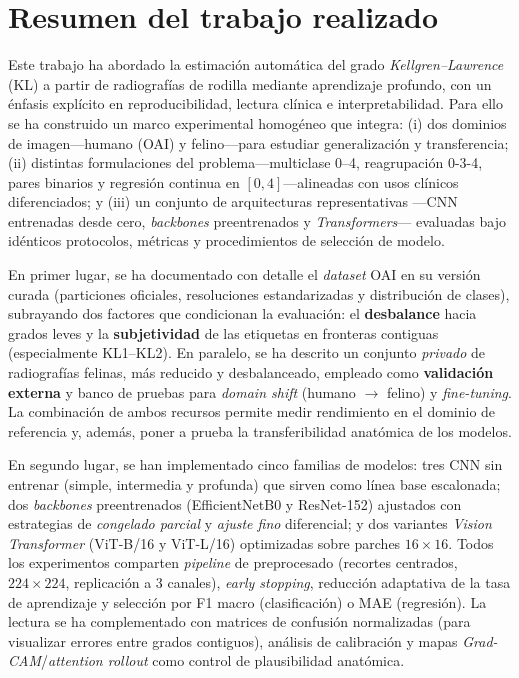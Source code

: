 \documentclass[11pt,spanish,listoffigures,listoftables]{tfgetsinf}
\begin{document}
\section{Resumen del trabajo realizado}
Este trabajo ha abordado la estimación automática del grado \emph{Kellgren--Lawrence} (KL) a partir de radiografías de rodilla mediante aprendizaje profundo, con un énfasis explícito en reproducibilidad, lectura clínica e interpretabilidad. Para ello se ha construido un marco experimental homogéneo que integra: (i) dos dominios de imagen—humano (OAI) y felino—para estudiar generalización y transferencia; (ii) distintas formulaciones del problema—multiclase 0--4, reagrupación 0-3-4, pares binarios y regresión continua en $[0,4]$—alineadas con usos clínicos diferenciados; y (iii) un conjunto de arquitecturas representativas —CNN entrenadas desde cero, \emph{backbones} preentrenados y \emph{Transformers}— evaluadas bajo idénticos protocolos, métricas y procedimientos de selección de modelo.

En primer lugar, se ha documentado con detalle el \textit{dataset} OAI en su versión curada (particiones oficiales, resoluciones estandarizadas y distribución de clases), subrayando dos factores que condicionan la evaluación: el \textbf{desbalance} hacia grados leves y la \textbf{subjetividad} de las etiquetas en fronteras contiguas (especialmente KL1–KL2). En paralelo, se ha descrito un conjunto \emph{privado} de radiografías felinas, más reducido y desbalanceado, empleado como \textbf{validación externa} y banco de pruebas para \emph{domain shift} (humano $\rightarrow$ felino) y \emph{fine-tuning}. La combinación de ambos recursos permite medir rendimiento en el dominio de referencia y, además, poner a prueba la transferibilidad anatómica de los modelos.

En segundo lugar, se han implementado cinco familias de modelos: tres CNN sin entrenar (simple, intermedia y profunda) que sirven como línea base escalonada; dos \emph{backbones} preentrenados (EfficientNetB0 y ResNet-152) ajustados con estrategias de \emph{congelado parcial} y \emph{ajuste fino} diferencial; y dos variantes \emph{Vision Transformer} (ViT-B/16 y ViT-L/16) optimizadas sobre parches $16{\times}16$. Todos los experimentos comparten \emph{pipeline} de preprocesado (recortes centrados, $224{\times}224$, replicación a 3 canales), \emph{early stopping}, reducción adaptativa de la tasa de aprendizaje y selección por F1 macro (clasificación) o MAE (regresión). La lectura se ha complementado con matrices de confusión normalizadas (para visualizar errores entre grados contiguos), análisis de calibración y mapas \emph{Grad-CAM}/\emph{attention rollout} como control de plausibilidad anatómica.
\end{document}
